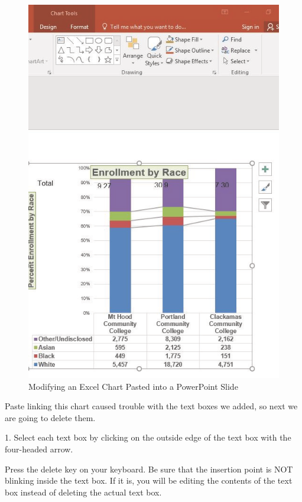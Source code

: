 \begin{figure}[H]
	\centering
	\includegraphics[width=\maxwidth{.95\linewidth}]{gfx/ch04_fig47}
	\caption{Modifying an Excel Chart Pasted into a PowerPoint Slide}
	\label{04:fig47}
\end{figure}

Paste linking this chart caused trouble with the text boxes we added, so next we are going to delete
them.

1. Select each text box by clicking on the outside edge of the text box with the four-headed arrow.

Press the delete key on your keyboard. Be sure that the insertion point is NOT blinking inside
the text box. If it is, you will be editing the contents of the text box instead of deleting the actual
text box.

